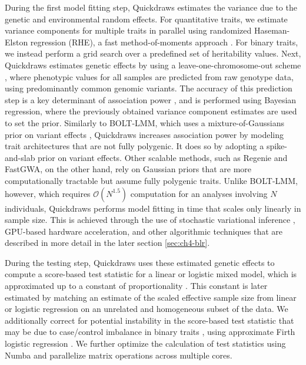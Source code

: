 During the first model fitting step, Quickdraws estimates the variance due to the genetic and environmental random effects.
%
For quantitative traits, we estimate variance components for multiple traits in parallel using randomized Haseman-Elston regression (RHE), a fast method-of-moments approach \cite{wu2018scalable,pazokitoroudi2020efficient,zhu2024ARGRHE}.
%
For binary traits, we instead perform a grid search over a predefined set of heritability values.
%
Next, Quickdraws estimates genetic effects by using a leave-one-chromosome-out scheme \cite{lippert2011fast, listgarten2012improved, yang2014advantages, loh2015efficient}, where phenotypic values for all samples are predicted from raw genotype data, using predominantly common genomic variants.
%
The accuracy of this prediction step is a key determinant of association power \cite{yang2014advantages}, and is performed using Bayesian regression, where the previously obtained variance component estimates are used to set the prior.
%
Similarly to BOLT-LMM, which uses a mixture-of-Gaussians prior on variant effects \cite{loh2015efficient,loh2018mixed}, Quickdraws increases association power by modeling trait architectures that are not fully polygenic.
%
It does so by adopting a spike-and-slab prior on variant effects.
%
Other scalable methods, such as Regenie and FastGWA, on the other hand, rely on Gaussian priors that are more computationally tractable but assume fully polygenic traits.
%
Unlike BOLT-LMM, however, which requires $\mathcal{O}(N^{1.5})$ computation for an analyses involving $N$ individuals, Quickdraws performs model fitting in time that scales only linearly in sample size.
%
This is achieved through the use of stochastic variational inference \cite{hoffman2013stochastic}, GPU-based hardware acceleration, and other algorithmic techniques that are described in more detail in the later section \ref{sec:ch4-blr}.
%

%
During the testing step, Quickdraws uses these estimated genetic effects to compute a score-based test statistic for a linear or logistic mixed model, which is approximated up to a constant of proportionality \cite{svishcheva2012rapid, jakobsdottir2013mastor, loh2015efficient}.
%
This constant is later estimated by matching an estimate of the scaled effective sample size \cite{yang2011genomic} from linear or logistic regression on an unrelated and homogeneous subset of the data.
%
We additionally correct for potential instability in the score-based test statistic that may be due to case/control imbalance in binary traits \cite{zhou2018efficiently}, using approximate Firth logistic regression \cite{mbatchou2021computationally}.
%
We further optimize the calculation of test statistics using Numba \cite{lam2015numba} and parallelize matrix operations across multiple cores.

